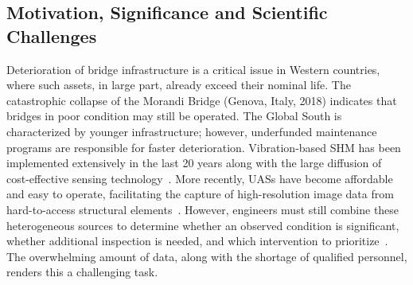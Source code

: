 \documentclass[12pt,a4paper]{article}
\begin{document}
\subsection{Motivation, Significance and Scientific Challenges}
Deterioration of bridge infrastructure is a critical issue in Western countries, where such assets, in large part, already exceed their nominal life. %
The catastrophic collapse of the Morandi Bridge (Genova, Italy, 2018) indicates that bridges in poor condition may still be operated. The Global South is characterized by younger infrastructure; however, underfunded maintenance programs are responsible for faster deterioration. Vibration-based SHM has been implemented extensively in the last 20 years along with the large diffusion of cost-effective sensing technology~\cite{figueiredo_three_2022}. More recently, UASs have become affordable and easy to operate, facilitating the capture of high-resolution image data from hard-to-access structural elements~\cite{panigati_drone-based_2025}. However, engineers must still combine these heterogeneous sources to determine whether an observed condition is significant, whether additional inspection is needed, and which intervention to prioritize~\cite{hoskere_unified_2025}. The overwhelming amount of data, along with the shortage of qualified personnel, renders this a challenging task. \par
%
%
\end{document}

